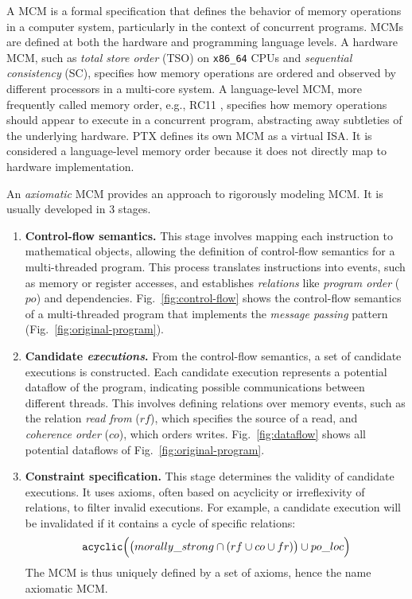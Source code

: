 \documentclass[acmsmall]{acmart}
\begin{document}
A MCM is a formal specification that defines the behavior of memory operations in a computer system, particularly in the context of concurrent programs. MCMs are defined at both the hardware and programming language levels. A hardware MCM, such as \textit{total store order} (TSO) on \verb|x86_64| CPUs and \textit{sequential consistency} (SC), specifies how memory operations are ordered and observed by different processors in a multi-core system. A language-level MCM, more frequently called memory order, e.g., RC11 \cite{rc11}, specifies how memory operations should appear to execute in a concurrent program, abstracting away subtleties of the underlying hardware. PTX defines its own MCM as a virtual ISA. It is considered a language-level memory order because it does not directly map to hardware implementation.

An \textit{axiomatic} MCM provides an approach to rigorously modeling MCM. It is usually developed in 3 stages.

\begin{enumerate}
    \item \textbf{Control-flow semantics.} This stage involves mapping each instruction to mathematical objects, allowing the definition of control-flow semantics for a multi-threaded program. This process translates instructions into events, such as memory or register accesses, and establishes \textit{relations} like \textit{program order} ($po$) and dependencies. Fig.~\ref{fig:control-flow} shows the control-flow semantics of a multi-threaded program that implements the \textit{message passing} pattern (Fig.~\ref{fig:original-program}). 
    \item \textbf{Candidate \textit{executions}.} From the control-flow semantics, a set of candidate executions is constructed. Each candidate execution represents a potential dataflow of the program, indicating possible communications between different threads. This involves defining relations over memory events, such as the relation \textit{read from} ($rf$), which specifies the source of a read, and \textit{coherence order} ($co$), which orders writes. Fig.~\ref{fig:dataflow} shows all potential dataflows of Fig.~\ref{fig:original-program}.
    \item \textbf{Constraint specification.} This stage determines the validity of candidate executions. It uses axioms, often based on acyclicity or irreflexivity of relations, to filter invalid executions. For example, a candidate execution will be invalidated if it contains a cycle of specific relations:
    $$
    \verb|acyclic|\Big(\big(morally\_strong \cap (rf \cup co \cup fr)\big) \cup po\_loc\Big)
    $$
    The MCM is thus uniquely defined by a set of axioms, hence the name axiomatic MCM. 
\end{enumerate}
\end{document}
